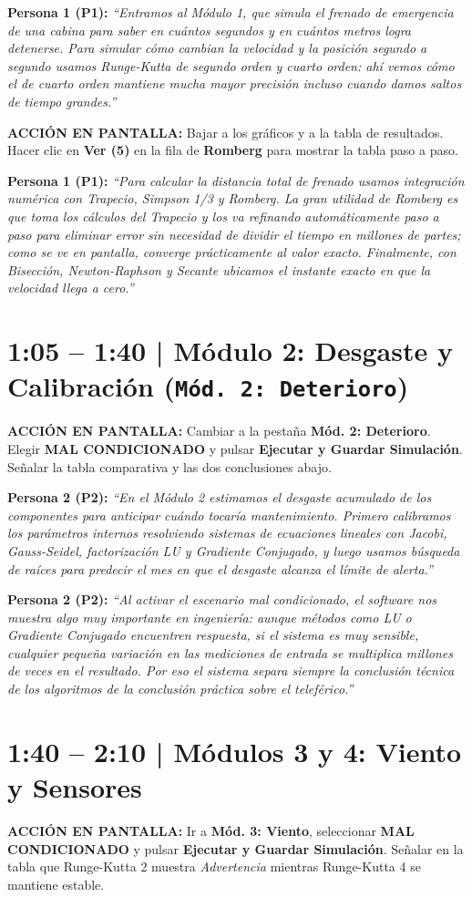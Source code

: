 \documentclass[11pt,a4paper]{article}
\newcommand{\accion}[1]{%
\begin{tcolorbox}[colback=accionbg,colframe=accionborder,boxrule=0.6pt,arc=2pt,left=6pt,right=6pt,top=4pt,bottom=4pt]
\small\textbf{ACCIÓN EN PANTALLA:} #1
\end{tcolorbox}
}
\newcommand{\puno}[1]{\noindent\textcolor{p1color}{\textbf{Persona 1 (P1):}} \textit{``#1''}\par\medskip}
\newcommand{\pdos}[1]{\noindent\textcolor{p2color}{\textbf{Persona 2 (P2):}} \textit{``#1''}\par\medskip}
\begin{document}
\puno{Entramos al Módulo 1, que simula el frenado de emergencia de una cabina para saber en cuántos segundos y en cuántos metros logra detenerse. Para simular cómo cambian la velocidad y la posición segundo a segundo usamos Runge-Kutta de segundo orden y cuarto orden: ahí vemos cómo el de cuarto orden mantiene mucha mayor precisión incluso cuando damos saltos de tiempo grandes.}

\accion{Bajar a los gráficos y a la tabla de resultados. Hacer clic en \textbf{Ver (5)} en la fila de \textbf{Romberg} para mostrar la tabla paso a paso.}

\puno{Para calcular la distancia total de frenado usamos integración numérica con Trapecio, Simpson 1/3 y Romberg. La gran utilidad de Romberg es que toma los cálculos del Trapecio y los va refinando automáticamente paso a paso para eliminar error sin necesidad de dividir el tiempo en millones de partes; como se ve en pantalla, converge prácticamente al valor exacto. Finalmente, con Bisección, Newton-Raphson y Secante ubicamos el instante exacto en que la velocidad llega a cero.}

\section{1:05 -- 1:40 | Módulo 2: Desgaste y Calibración (\texttt{Mód. 2: Deterioro})}
\accion{Cambiar a la pestaña \textbf{Mód. 2: Deterioro}. Elegir \textbf{MAL CONDICIONADO} y pulsar \textbf{Ejecutar y Guardar Simulación}. Señalar la tabla comparativa y las dos conclusiones abajo.}

\pdos{En el Módulo 2 estimamos el desgaste acumulado de los componentes para anticipar cuándo tocaría mantenimiento. Primero calibramos los parámetros internos resolviendo sistemas de ecuaciones lineales con Jacobi, Gauss-Seidel, factorización LU y Gradiente Conjugado, y luego usamos búsqueda de raíces para predecir el mes en que el desgaste alcanza el límite de alerta.}

\pdos{Al activar el escenario mal condicionado, el software nos muestra algo muy importante en ingeniería: aunque métodos como LU o Gradiente Conjugado encuentren respuesta, si el sistema es muy sensible, cualquier pequeña variación en las mediciones de entrada se multiplica millones de veces en el resultado. Por eso el sistema separa siempre la conclusión técnica de los algoritmos de la conclusión práctica sobre el teleférico.}

\section{1:40 -- 2:10 | Módulos 3 y 4: Viento y Sensores}
\accion{Ir a \textbf{Mód. 3: Viento}, seleccionar \textbf{MAL CONDICIONADO} y pulsar \textbf{Ejecutar y Guardar Simulación}. Señalar en la tabla que Runge-Kutta 2 muestra \textit{Advertencia} mientras Runge-Kutta 4 se mantiene estable.}
\end{document}
